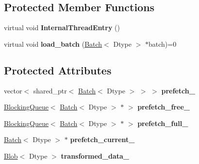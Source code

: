 \subsection*{Protected Member Functions}
\begin{DoxyCompactItemize}
\item 
virtual void {\bfseries Internal\+Thread\+Entry} ()\hypertarget{classcaffe_1_1BasePrefetchingDataLayer_aa2740717d51bd0b01646ace302991838}{}\label{classcaffe_1_1BasePrefetchingDataLayer_aa2740717d51bd0b01646ace302991838}

\item 
virtual void {\bfseries load\+\_\+batch} (\hyperlink{classcaffe_1_1Batch}{Batch}$<$ Dtype $>$ $\ast$batch)=0\hypertarget{classcaffe_1_1BasePrefetchingDataLayer_adab5b2e3013120a767d2be6ba609f045}{}\label{classcaffe_1_1BasePrefetchingDataLayer_adab5b2e3013120a767d2be6ba609f045}

\end{DoxyCompactItemize}
\subsection*{Protected Attributes}
\begin{DoxyCompactItemize}
\item 
vector$<$ shared\+\_\+ptr$<$ \hyperlink{classcaffe_1_1Batch}{Batch}$<$ Dtype $>$ $>$ $>$ {\bfseries prefetch\+\_\+}\hypertarget{classcaffe_1_1BasePrefetchingDataLayer_ae1beb4fe2338b694324e375624015a2c}{}\label{classcaffe_1_1BasePrefetchingDataLayer_ae1beb4fe2338b694324e375624015a2c}

\item 
\hyperlink{classcaffe_1_1BlockingQueue}{Blocking\+Queue}$<$ \hyperlink{classcaffe_1_1Batch}{Batch}$<$ Dtype $>$ $\ast$ $>$ {\bfseries prefetch\+\_\+free\+\_\+}\hypertarget{classcaffe_1_1BasePrefetchingDataLayer_a8ca3d78f628c0290ee7254a918f7e5db}{}\label{classcaffe_1_1BasePrefetchingDataLayer_a8ca3d78f628c0290ee7254a918f7e5db}

\item 
\hyperlink{classcaffe_1_1BlockingQueue}{Blocking\+Queue}$<$ \hyperlink{classcaffe_1_1Batch}{Batch}$<$ Dtype $>$ $\ast$ $>$ {\bfseries prefetch\+\_\+full\+\_\+}\hypertarget{classcaffe_1_1BasePrefetchingDataLayer_a93b1730c7e6b96c80488ad281bada2d4}{}\label{classcaffe_1_1BasePrefetchingDataLayer_a93b1730c7e6b96c80488ad281bada2d4}

\item 
\hyperlink{classcaffe_1_1Batch}{Batch}$<$ Dtype $>$ $\ast$ {\bfseries prefetch\+\_\+current\+\_\+}\hypertarget{classcaffe_1_1BasePrefetchingDataLayer_a4b95c4ad255203d052657695bc681a5c}{}\label{classcaffe_1_1BasePrefetchingDataLayer_a4b95c4ad255203d052657695bc681a5c}

\item 
\hyperlink{classcaffe_1_1Blob}{Blob}$<$ Dtype $>$ {\bfseries transformed\+\_\+data\+\_\+}\hypertarget{classcaffe_1_1BasePrefetchingDataLayer_afbff8f9e7c0e0f4007d2cc742b4ad874}{}\label{classcaffe_1_1BasePrefetchingDataLayer_afbff8f9e7c0e0f4007d2cc742b4ad874}

\end{DoxyCompactItemize}


